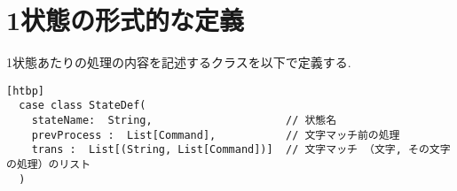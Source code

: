 \documentclass[uplatex,a4j]{jsreport}
\begin{document}




\section{1状態の形式的な定義}
\label{StateDef}
1状態あたりの処理の内容を記述するクラスを以下で定義する. 
\begin{lstlisting}[basicstyle=\ttfamily\footnotesize, frame=single][htbp]
  case class StateDef(
    stateName:  String,                     // 状態名
    prevProcess :  List[Command],           // 文字マッチ前の処理
    trans :  List[(String, List[Command])]  // 文字マッチ （文字, その文字の処理）のリスト
  )
\end{lstlisting}
\end{document}
